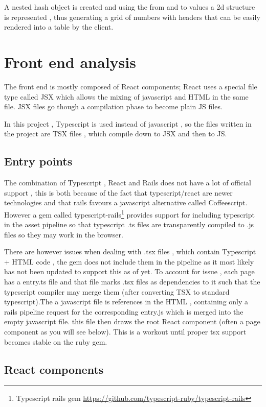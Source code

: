 A nested hash object is created and using the from and to values a 2d structure is represented , thus generating a grid of numbers with headers that can be easily rendered into a table by the client.

\section{Front end analysis}
The front end is mostly composed of React components; React uses a special file type called JSX\cite{jsx} which allows the mixing of javascript and HTML in the same file. JSX files go though a compilation phase to become plain JS files.

In this project , Typescript is used instead of javascript , so the files written in the project are TSX files , which compile down to JSX and then to JS.

\subsection{Entry points}
The combination of Typescript , React and Rails does not have a lot of official support , this is both because of the fact that typescript/react are newer technologies and that rails favours a javascript alternative called Coffeescript. However a gem called typescript-rails\footnote{Typescript rails gem \url{https://github.com/typescript-ruby/typescript-rails}} provides support for including typescript in the asset pipeline so that typescript .ts files are transparently compiled to .js files so they may work in the browser.

There are however issues when dealing with .tsx files , which contain Typescript + HTML code , the gem does not include them in the pipeline as it most likely has not been updated to support this as of yet. To account for issue , each page has a entry.ts file and that file marks .tsx files as dependencies to it such that the typescript compiler may merge them (after converting TSX to standard typescript).The a javascript file is references in the HTML , containing only a rails pipeline request for the corresponding entry.js which is merged into the empty javascript file. this file then draws the root React component (often a page component as you will see below). This is a workout until proper tsx support becomes stable on the ruby gem.

\subsection{React components}
